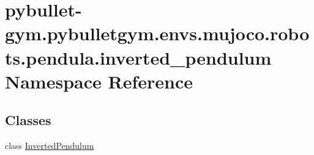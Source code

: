 \hypertarget{namespacepybullet-gym_1_1pybulletgym_1_1envs_1_1mujoco_1_1robots_1_1pendula_1_1inverted__pendulum}{}\section{pybullet-\/gym.pybulletgym.\+envs.\+mujoco.\+robots.\+pendula.\+inverted\+\_\+pendulum Namespace Reference}
\label{namespacepybullet-gym_1_1pybulletgym_1_1envs_1_1mujoco_1_1robots_1_1pendula_1_1inverted__pendulum}
\subsection*{Classes}
\begin{DoxyCompactItemize}
\item 
class \hyperlink{classpybullet-gym_1_1pybulletgym_1_1envs_1_1mujoco_1_1robots_1_1pendula_1_1inverted__pendulum_1_1_inverted_pendulum}{Inverted\+Pendulum}
\end{DoxyCompactItemize}
